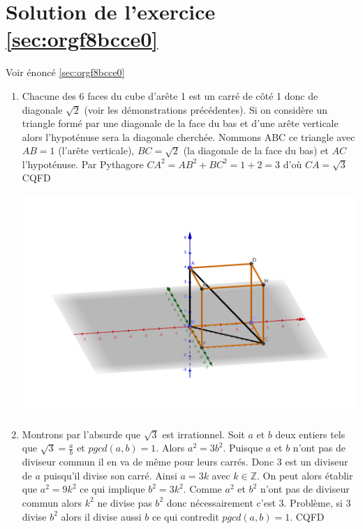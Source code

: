 \documentclass[a4paper, 11pt, twoside]{book}
\newcommand{\Z}{\mathbb{Z}}
\begin{document}
\section{Solution de l'exercice \ref{sec:orgf8bcce0}}
\label{sec:org1db2d7e}
Voir énoncé \ref{sec:orgf8bcce0}

\begin{enumerate}
\item Chacune des 6 faces du cube d'arête 1 est un carré de côté 1
donc de diagonale \(\sqrt{2}\) (voir les démonstrations
précédentes). Si on considère un triangle formé par une
diagonale de la face du bas et d'une arête verticale alors
l'hypoténuse sera la diagonale cherchée. Nommons ABC ce
triangle avec \(AB = 1\) (l'arête verticale), \(BC = \sqrt{2}\) (la
diagonale de la face du bas) et \(AC\) l'hypoténuse. Par
Pythagore \(CA^2 = AB^2 + BC^2 = 1 + 2 = 3\) d'où \(CA = \sqrt{3}\)
CQFD

\begin{center}
\includegraphics[width=.9\linewidth]{./img/cube-sqrt3-png.png}
\end{center}
\item Montrons par l'absurde que \(\sqrt{3}\) est irrationnel. Soit \(a\)
et \(b\) deux entiers tels que \(\sqrt{3} = \frac{a}{b}\) et
\(pgcd(a, b) = 1\). Alors \(a^2 = 3b^2\). Puisque \(a\) et \(b\) n'ont
pas de diviseur commun il en va de même pour leurs carrés. Donc
3 est un diviseur de \(a\) puisqu'il divise son carré. Ainsi \(a =
       3k\) avec \(k\in\Z\). On peut alors établir que \(a^2 =
       9k^2\) ce qui implique \(b^2 = 3k^2\). Comme \(a^2\) et \(b^2\) n'ont
pas de diviseur commun alors \(k^2\) ne divise pas \(b^2\) donc
nécessairement c'est 3. Problème, si 3 divise \(b^2\) alors il
divise aussi \(b\) ce qui contredit \(pgcd(a, b) = 1\). CQFD
\end{enumerate}
\end{document}
